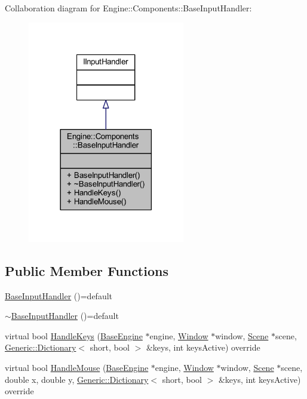 Collaboration diagram for Engine\+:\+:Components\+:\+:Base\+Input\+Handler\+:
\nopagebreak
\begin{figure}[H]
\begin{center}
\leavevmode
\includegraphics[width=194pt]{classEngine_1_1Components_1_1BaseInputHandler__coll__graph}
\end{center}
\end{figure}
\subsection*{Public Member Functions}
\begin{DoxyCompactItemize}
\item 
\mbox{\hyperlink{classEngine_1_1Components_1_1BaseInputHandler_a6a40d61a56fa4f49ae7e6f8cd63c4877}{Base\+Input\+Handler}} ()=default
\item 
\mbox{\hyperlink{classEngine_1_1Components_1_1BaseInputHandler_a538dba6ed33f86a6394c53bd5fb50abe}{$\sim$\+Base\+Input\+Handler}} ()=default
\item 
virtual bool \mbox{\hyperlink{classEngine_1_1Components_1_1BaseInputHandler_af7deea3367074324fdbefe48119d40ce}{Handle\+Keys}} (\mbox{\hyperlink{classEngine_1_1BaseEngine}{Base\+Engine}} $\ast$engine, \mbox{\hyperlink{classEngine_1_1Components_1_1Window}{Window}} $\ast$window, \mbox{\hyperlink{classEngine_1_1Components_1_1Scene}{Scene}} $\ast$scene, \mbox{\hyperlink{classGeneric_1_1Dictionary}{Generic\+::\+Dictionary}}$<$ short, bool $>$ \&keys, int keys\+Active) override
\item 
virtual bool \mbox{\hyperlink{classEngine_1_1Components_1_1BaseInputHandler_a8b50fb66d01573616072d708075a721e}{Handle\+Mouse}} (\mbox{\hyperlink{classEngine_1_1BaseEngine}{Base\+Engine}} $\ast$engine, \mbox{\hyperlink{classEngine_1_1Components_1_1Window}{Window}} $\ast$window, \mbox{\hyperlink{classEngine_1_1Components_1_1Scene}{Scene}} $\ast$scene, double x, double y, \mbox{\hyperlink{classGeneric_1_1Dictionary}{Generic\+::\+Dictionary}}$<$ short, bool $>$ \&keys, int keys\+Active) override
\end{DoxyCompactItemize}


